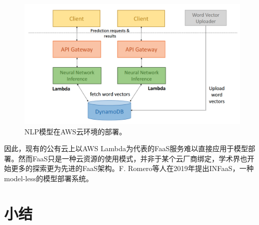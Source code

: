 \begin{figure}[h]
    \centerline{\includegraphics[width=\textwidth]{figures/nlp-serving-arch.png}}
    \caption{NLP模型在AWS云环境的部署。}
    \label{nlp_serving_arch}
\end{figure}

因此，现有的公有云上以AWS Lambda为代表的FaaS服务难以直接应用于模型部署。然而FaaS只是一种云资源的使用模式，并非于某个云厂商绑定，学术界也开始更多的探索更为先进的FaaS架构。F. Romero等人在2019年提出INFaaS，一种model-less的模型部署系统。

\section{小结}
